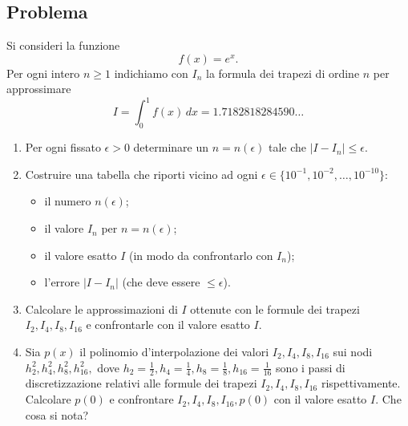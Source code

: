 \documentclass[a4paper,12pt]{article}
\begin{document}
\subsection{Problema}
Si consideri la funzione
\begin{equation*}
f(x)=e^x.
\end{equation*}
Per ogni intero $n\geq1$ indichiamo con $I_n$ la formula dei trapezi di ordine $n$ per approssimare
\begin{equation*}
I = \int_{0}^{1} f(x)\,dx = 1.7182818284590\dots
\end{equation*}
\begin{enumerate}[label=(\alph*)]
\item Per ogni fissato $\epsilon>0$ determinare un $n = n(\epsilon)$ tale che $|I-I_n|\leq\epsilon$.
\item Costruire una tabella che riporti vicino ad ogni $\epsilon\in\{10^{-1},10^{-2},\dots,10^{-10}\}$:
\begin{itemize}
\item il numero $n(\epsilon)$;
\item il valore $I_n$ per $n = n(\epsilon)$;
\item il valore esatto $I$ (in modo da confrontarlo con $I_n$);
\item l’errore $|I-I_n|$ (che deve essere $\leq\epsilon$).
\end{itemize}
\item Calcolare le approssimazioni di $I$ ottenute con le formule dei trapezi $I_2, I_4, I_8,I_{16}$ e confrontarle con
il valore esatto $I$.
\item Sia $p(x)$ il polinomio d’interpolazione dei valori $I_2, I_4, I_8,I_{16}$ sui nodi $h^2_2,h^2_4,h^2_8,h^2_{16},$ dove $h_2=\frac{1}{2}, h_4=\frac{1}{4},h_8=\frac{1}{8},h_{16}=\frac{1}{16}$ sono i passi di discretizzazione relativi alle formule dei trapezi $I_2, I_4, I_8,I_{16}$
rispettivamente. Calcolare $p(0)$ e confrontare $I_2, I_4, I_8,I_{16}, p(0)$ con il valore esatto $I$. Che cosa si
nota?
\end{enumerate}
\end{document}
